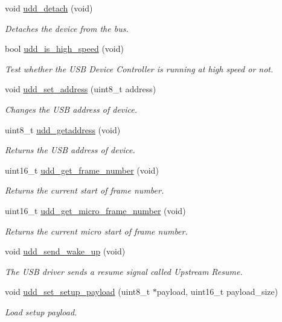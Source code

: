 \begin{DoxyCompactItemize}
void \hyperlink{group__udd__group_ga03e59eaa264f1dbe5a52559311d0520e}{udd\-\_\-detach} (void)
\begin{DoxyCompactList}\small\item\em \-Detaches the device from the bus. \end{DoxyCompactList}\item 
bool \hyperlink{group__udd__group_ga85f403ddb78776b1ba014dafd3ffec2c}{udd\-\_\-is\-\_\-high\-\_\-speed} (void)
\begin{DoxyCompactList}\small\item\em \-Test whether the \-U\-S\-B \-Device \-Controller is running at high speed or not. \end{DoxyCompactList}\item 
void \hyperlink{group__udd__group_ga05da762e0faf9d478e532de40afa71f6}{udd\-\_\-set\-\_\-address} (uint8\-\_\-t address)
\begin{DoxyCompactList}\small\item\em \-Changes the \-U\-S\-B address of device. \end{DoxyCompactList}\item 
uint8\-\_\-t \hyperlink{group__udd__group_gaebd36638d482f6df00a8aff006ef2246}{udd\-\_\-getaddress} (void)
\begin{DoxyCompactList}\small\item\em \-Returns the \-U\-S\-B address of device. \end{DoxyCompactList}\item 
uint16\-\_\-t \hyperlink{group__udd__group_ga96dc248cc05e07ffe2cf21e4d7465320}{udd\-\_\-get\-\_\-frame\-\_\-number} (void)
\begin{DoxyCompactList}\small\item\em \-Returns the current start of frame number. \end{DoxyCompactList}\item 
uint16\-\_\-t \hyperlink{group__udd__group_ga63047eec59b8e8798ca1d3366472d82b}{udd\-\_\-get\-\_\-micro\-\_\-frame\-\_\-number} (void)
\begin{DoxyCompactList}\small\item\em \-Returns the current micro start of frame number. \end{DoxyCompactList}\item 
void \hyperlink{group__udd__group_ga14ae6068206556d6ae8766b1baa2f686}{udd\-\_\-send\-\_\-wake\-\_\-up} (void)
\begin{DoxyCompactList}\small\item\em \-The \-U\-S\-B driver sends a resume signal called \-Upstream \-Resume. \end{DoxyCompactList}\item 
void \hyperlink{group__udd__group_ga017ef5ea7626be258c24d345218976f9}{udd\-\_\-set\-\_\-setup\-\_\-payload} (uint8\-\_\-t $\ast$payload, uint16\-\_\-t payload\-\_\-size)
\begin{DoxyCompactList}\small\item\em \-Load setup payload. \end{DoxyCompactList}\end{DoxyCompactItemize}
